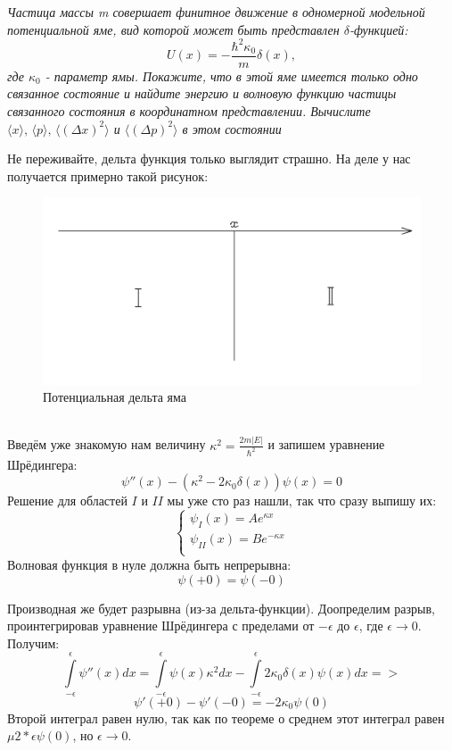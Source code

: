 \begin{center}
    \textit{Частица массы m совершает финитное движение в одномерной модельной потенциальной яме, вид которой может быть представлен $\delta$-функцией:}
    \[
    U(x) = -\frac{\hbar^2\kappa_0}{m}\delta(x),
    \]
    \textit{где $\kappa_0$ - параметр ямы. Покажите, что в этой яме имеется только одно связанное состояние и найдите энергию и волновую функцию частицы связанного состояния в координатном представлении. Вычислите $\langle x\rangle,\,\langle p\rangle,\,\langle (\Delta x)^2\rangle$ и $\langle (\Delta p)^2\rangle$ в этом состоянии}
\end{center}
Не переживайте, дельта функция только выглядит страшно. На деле у нас получается примерно такой рисунок:
\begin{figure}[h!]
\centering
\includegraphics[scale=0.26]{class 4/images/delta hole.png}
\caption{Потенциальная дельта яма}
\label{fig 4.2}
\end{figure}\\
Введём уже знакомую нам величину $\kappa^2 = \frac{2m|E|}{\hbar^2}$ и запишем уравнение Шрёдингера:
\[
\psi''(x) - (\kappa^2 - 2\kappa_0\delta(x))\psi(x) = 0
\]
Решение для областей $I$ и $II$ мы уже сто раз нашли, так что сразу выпишу их:
\[
\begin{cases}
    \psi_I(x) = Ae^{\kappa x}\\
    \psi_{II}(x) = Be^{-\kappa x}\\
\end{cases}
\]
Волновая функция в нуле должна быть непрерывна: 
\begin{equation}
\psi(+0) = \psi(-0)    
\end{equation}

Производная же будет разрывна (из-за дельта-функции). Доопределим разрыв, проинтегрировав уравнение Шрёдингера с пределами от $-\epsilon$ до $\epsilon$, где $\epsilon \rightarrow 0$. Получим:
\[
\int\limits_{-\epsilon}^{\epsilon}\psi''(x)dx = \int\limits_{-\epsilon}^{\epsilon}\psi(x)\kappa^2 dx - \int\limits_{-\epsilon}^{\epsilon}2\kappa_0\delta(x)\psi(x) dx =>
\]
\[
    \psi'(+0) - \psi'(-0) = -2\kappa_0\psi(0)    
\]
Второй интеграл равен нулю, так как по теореме о среднем этот интеграл равен $\mu2*\epsilon\psi(0)$, но $\epsilon \rightarrow 0$.

